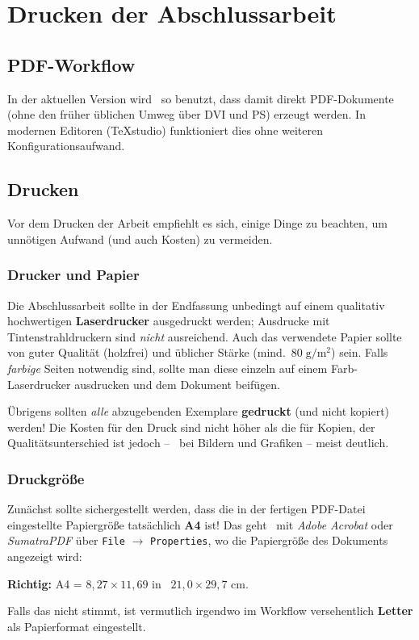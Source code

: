 \chapter{Drucken der Abschlussarbeit}
\label{cha:Drucken}


\section{PDF-Workflow}
\label{sec:pdf}

In der aktuellen Version wird \latex\ so benutzt, dass damit direkt
PDF-Dokumente (ohne den früher üblichen Umweg über DVI und PS) erzeugt werden.
In modernen Editoren (\zB TeXstudio) funktioniert dies ohne weiteren
Konfigurationsaufwand.


\section{Drucken}

Vor dem Drucken der Arbeit empfiehlt es sich, einige Dinge zu beachten, um
unnötigen Aufwand (und auch Kosten) zu vermeiden.

\subsection{Drucker und Papier}

Die Abschlussarbeit sollte in der Endfassung unbedingt auf einem qualitativ
hochwertigen \textbf{Laserdrucker} ausgedruckt werden; Ausdrucke mit
Tintenstrahldruckern sind \emph{nicht} ausreichend. Auch das verwendete
Papier sollte von guter Qualität (holzfrei) und üblicher Stärke (mind.\ $80\;
{\mathrm g} / {\mathrm m}^2$) sein. Falls \emph{farbige} Seiten notwendig
sind, sollte man diese einzeln auf einem Farb-Laserdrucker ausdrucken und dem
Dokument beifügen.

Übrigens sollten \emph{alle} abzugebenden Exemplare \textbf{gedruckt} (und
nicht kopiert) werden! Die Kosten für den Druck sind nicht höher als die für
Kopien, der Qualitätsunterschied ist jedoch -- \va\ bei Bildern und Grafiken
-- meist deutlich.

\subsection{Druckgröße}

Zunächst sollte sichergestellt werden, dass die in der fertigen PDF-Datei
eingestellte Papiergröße tatsächlich \textbf{A4} ist! Das geht \zB\ mit
\emph{Adobe Acrobat} oder \emph{SumatraPDF} über \texttt{File} $\rightarrow$
\texttt{Properties}, wo die Papiergröße des Dokuments angezeigt wird:
\begin{center}
	\textbf{Richtig:} A4 = $8{,}27 \times 11{,}69$ in \bzw\ $21{,}0 \times 29{,}7$ cm.
\end{center}
Falls das nicht stimmt, ist vermutlich irgendwo im Workflow versehentlich
\textbf{Letter} als Papierformat eingestellt.



